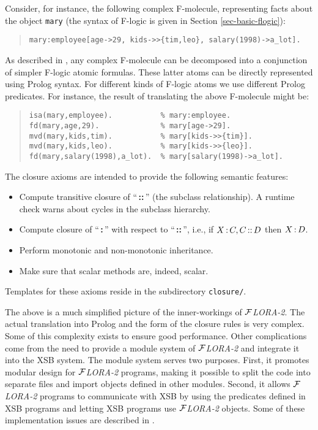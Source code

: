 \documentclass[11pt]{article}
\newcommand{\isa}{\,{\bf{:}}\,}
\newcommand{\subcl}{\,{\bf{::}}\,}
\newcommand{\FLORA}{{\mbox{${\cal F}${\small\it LORA}\rm\emph{-2}}}\xspace}
\newcommand{\fl}{\mbox{F-logic}\xspace}
\begin{document}
Consider, for instance, the following complex F-molecule, representing
facts about the object \texttt{mary} (the syntax of \fl is given in
Section \ref{sec-basic-flogic}):

\begin{quote}
{\small\begin{verbatim}
mary:employee[age->29, kids->>{tim,leo}, salary(1998)->a_lot].
\end{verbatim}}
\end{quote}

As described in \cite{KLW95}, any complex F-molecule can be
decomposed into a conjunction of simpler \fl atomic formulas. These
latter atoms can be directly represented using Prolog syntax.  For
different kinds of \fl atoms we use different Prolog predicates. For
instance, the result of translating the above F-molecule might be:

\begin{quote}
{\small
\begin{verbatim}
isa(mary,employee).           % mary:employee.
fd(mary,age,29).              % mary[age->29].
mvd(mary,kids,tim).           % mary[kids->>{tim}].
mvd(mary,kids,leo).           % mary[kids->>{leo}].
fd(mary,salary(1998),a_lot).  % mary[salary(1998)->a_lot].
\end{verbatim}
  }
\end{quote}

The closure axioms are intended to provide the following semantic features:
\begin{itemize}
\item Compute transitive closure of ``\subcl'' (the subclass relationship).  A
  runtime check warns about cycles in the subclass hierarchy.
\item Compute closure of ``\isa'' with respect to ``\subcl'', i.e., if $X\isa C,
  C\subcl D$ then $X\isa D$.
\item Perform monotonic and non-monotonic inheritance.
\item Make sure that scalar methods are, indeed, scalar.
\end{itemize}
Templates for these axioms reside in the subdirectory \texttt{closure/}.

The above is a much simplified picture of the inner-workings of \FLORA. The
actual translation into Prolog and the form of the closure rules is very
complex.  Some of this complexity exists to ensure good performance.  Other
complications come from the need to provide a module system of \FLORA and
integrate it into the XSB system.  The module system serves two purposes.
First, it promotes modular design for \FLORA programs, making it possible
to split the code into separate files and import objects defined in other
modules. Second, it allows \FLORA programs to communicate with XSB by using
the predicates defined in XSB programs and letting XSB programs use \FLORA
objects.  Some of these implementation issues are described in
\cite{guiz-flora-00}.





\printindex
\end{document}
